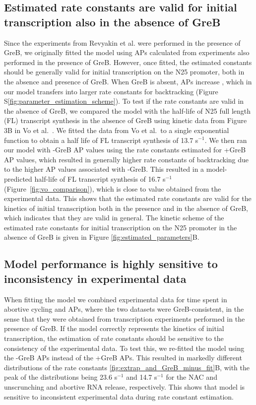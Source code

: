 \subsection{Estimated rate constants are valid for initial transcription also
in the absence of GreB}
Since the experiments from Revyakin et al. were performed in the presence of
GreB, we originally fitted the model using APs calculated from experiments
also performed in the presence of GreB. However, once fitted, the estimated
constants should be generally valid for initial transcription on the N25
promoter, both in the absence and presence of GreB. When GreB is absent, APs
increase \cite{hsu_initial_2006}, which in our model transfers into larger
rate constants for backtracking (Figure
S\ref{fig:parameter_estimation_scheme}). To test if the rate constants are
valid in the absence of GreB, we compared the model with the half-life of N25
full length (FL) transcript synthesis in the absence of GreB using kinetic data
from Figure 3B in Vo et al.\ \cite{vo_vitro_2003-1}. We fitted the data from
Vo et al.\ to a single exponential function to obtain a half life of FL
transcript synthesis of 13.7 s$^{-1}$. We then ran our model with -GreB AP
values using the rate constants estimated for +GreB AP values, which resulted
in generally higher rate constants of backtracking due to the higher AP values
associated with -GreB. This resulted in a model-predicted half-life of FL
transcript synthesis of 16.7 s$^{-1}$ (Figure~\ref{fig:vo_comparison}), which
is close to value obtained from the experimental data. This shows that the
estimated rate constants are valid for the kinetics of initial transcription
both in the presence and in the absence of GreB, which indicates that they are
valid in general. The kinetic scheme of the estimated rate constants for
initial transcription on the N25 promoter in the absence of GreB is given in
Figure \ref{fig:estimated_parameters}B.

\subsection{Model performance is highly sensitive to inconsistency in experimental data}
When fitting the model we combined experimental data for time spent in
abortive cycling and APs, where the two datasets were GreB-consistent, in the
sense that they were obtained from transcription experiments performed in the
presence of GreB. If the model correctly represents the kinetics of initial
transcription, the estimation of rate constants should be sensitive to the
consistency of the experimental data. To test this, we re-fitted the
model using the -GreB APs instead of the +GreB APs. This resulted in markedly
different distributions of the rate constants
\ref{fig:extrap_and_GreB_minus_fit}B, with the peak of the distributions being
23.6 s$^{-1}$ and 14.7 s$^{-1}$ for the NAC and unscrunching and abortive RNA
release, respectively. This shows that model is sensitive to inconsistent
experimental data during rate constant estimation.

